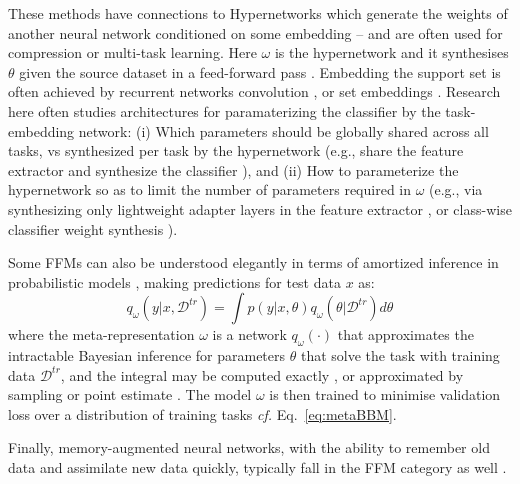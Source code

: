 \documentclass[10pt,journal,compsoc]{IEEEtran}
\begin{document}
These methods have connections to Hypernetworks \cite{ha2016hypernetworks, brock2017smash} which generate the weights of another neural network conditioned on some embedding -- and are often used for compression or multi-task learning. Here $\omega$ is the hypernetwork and it synthesises $\theta$ given the source dataset in a feed-forward pass \cite{rusu2019leo,rakelly2019pearl}. Embedding the support set is often achieved by recurrent networks \cite{duan2017one,wang2016l2rl,hochreiter2001learning} convolution \cite{mishra2017simple}, or set embeddings \cite{gordon2018metaprobainference,requeima2019cnap}.
Research here often studies architectures for paramaterizing the classifier by the task-embedding network: (i) Which parameters should be globally shared across all tasks, vs synthesized per task by the hypernetwork (e.g., share the feature extractor and synthesize the classifier \cite{chen2019closerfewshot,qiao2017parametersfromactivations}), and (ii) How to parameterize the hypernetwork so as to limit the number of parameters required in $\omega$ (e.g., via synthesizing only lightweight adapter layers in the feature extractor \cite{requeima2019cnap}, or class-wise classifier weight synthesis  \cite{gordon2018metaprobainference}). 

Some FFMs can also be understood elegantly in terms of amortized inference in probabilistic models \cite{heskes2000empirical,gordon2018metaprobainference}, making predictions for test data $x$ as:
\begin{equation}
q_\omega(y|x,\mathcal{D}^{tr})=\int p(y|x,\theta)q_\omega(\theta|\mathcal{D}^{tr})d\theta \label{eq:amortized}
\end{equation}
where the meta-representation $\omega$ is a network $q_\omega(\cdot)$ that approximates the intractable Bayesian inference for parameters $\theta$ that solve the task with training data $\mathcal{D}^{tr}$, and the integral may be computed exactly \cite{heskes2000empirical}, or approximated by sampling \cite{gordon2018metaprobainference} or point estimate \cite{requeima2019cnap}. The model $\omega$ is then trained to minimise validation loss over a distribution of training tasks \emph{cf.} Eq.~\ref{eq:metaBBM}.

Finally, memory-augmented neural networks, with the ability to remember old data and assimilate new data quickly, typically fall in the FFM category as well \cite{santoro2016metamemory,munkhdalai2017metanets}. 
\end{document}

